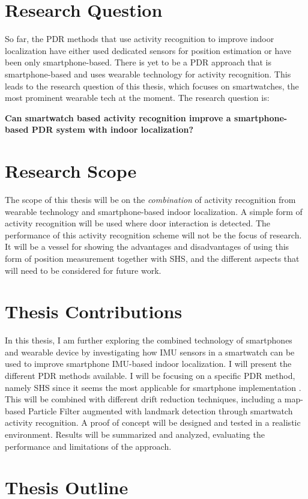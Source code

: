 \section{Research Question}

So far, the PDR methods that use activity recognition to improve indoor localization have either used dedicated sensors for position estimation or have been only smartphone-based. There is yet to be a \ac{PDR} approach that is smartphone-based and uses wearable technology for activity recognition. This leads to the research question of this thesis, which focuses on smartwatches, the most prominent wearable tech at the moment. The research question is:

\textbf{Can smartwatch based activity recognition improve a smartphone-based \ac{PDR} system with indoor localization?}

\section{Research Scope}

The scope of this thesis will be on the \textit{combination} of activity recognition from wearable technology and smartphone-based indoor localization. A simple form of activity recognition will be used where door interaction is detected. The performance of this activity recognition scheme will not be the focus of research. It will be a vessel for showing the advantages and disadvantages of using this form of position measurement together with \ac{SHS}, and the different aspects that will need to be considered for future work.

\section{Thesis Contributions}

In this thesis, I am further exploring the combined technology of smartphones and wearable device by investigating how \ac{IMU} sensors in a smartwatch can be used to improve smartphone IMU-based indoor localization. I will present the different \ac{PDR} methods available. I will be focusing on a specific \ac{PDR} method, namely \ac{SHS} since it seems the most applicable for smartphone implementation \cite{Kang2015}. This will be combined with different drift reduction techniques, including a map-based Particle Filter augmented with landmark detection through smartwatch activity recognition. A proof of concept will be designed and tested in a realistic environment. Results will be summarized and analyzed, evaluating the performance and limitations of the approach.

\section{Thesis Outline}
